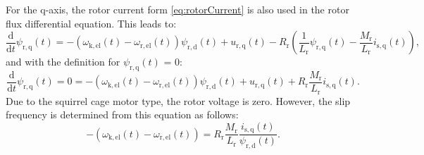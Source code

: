 \begin{solutionblock}
    For the q-axis, the rotor current form \eqref{eq:rotorCurrent} is also used in the rotor flux differential equation. This leads to:
    \begin{equation}
        \frac{\mathrm{d}}{\mathrm{d}t} \psi_{\mathrm{r,q}}(t) = -(\omega_{\mathrm{k,el}}(t)-\omega_{\mathrm{r,el}}(t))\psi_{\mathrm{r,d}}(t) + u_{\mathrm{r,q}}(t) - R_{\mathrm{r}} \left(\frac{1}{L_{\mathrm{r}}} \psi_{\mathrm{r,q}}(t) - \frac{M_{\mathrm{r}}}{L_{\mathrm{r}}}i_{\mathrm{s,q}}(t) \right),
    \end{equation}
    and with the definition for $\psi_{\mathrm{r,q}}(t)$ = 0:
    \begin{equation}
        \frac{\mathrm{d}}{\mathrm{d}t} \psi_{\mathrm{r,q}}(t) = 0 = -(\omega_{\mathrm{k,el}}(t)-\omega_{\mathrm{r,el}}(t))\psi_{\mathrm{r,d}}(t) + u_{\mathrm{r,q}}(t) + R_{\mathrm{r}} \frac{M_{\mathrm{r}}}{L_{\mathrm{r}}}i_{\mathrm{s,q}}(t).
    \end{equation}
    Due to the squirrel cage motor type, the rotor voltage is zero. However, the slip frequency is determined from this equation as follows:
    \begin{equation}
        -(\omega_{\mathrm{k,el}}(t)-\omega_{\mathrm{r,el}}(t))
        = R_{\mathrm{r}} \frac{M_{\mathrm{r}}}{L_{\mathrm{r}}} \frac{i_{\mathrm{s,q}}(t)}{\psi_{\mathrm{r,d}}(t)}.
    \end{equation}


\end{solutionblock}
